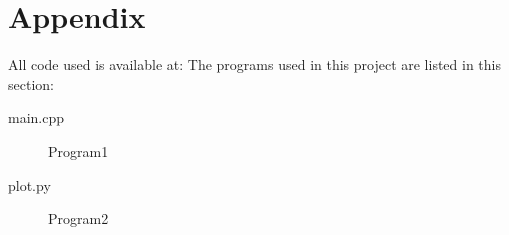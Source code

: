 \documentclass[%
 reprint,
 nobalance,
 amsmath,amssymb,
 aps,
]{revtex4-1}
\begin{document}
\section{Appendix}
All code used is available at: %
The programs used in this project are listed in this section:

\begin{description}
\item [main.cpp] Program1
\item [plot.py] Program2
\end{description}

\end{document}
